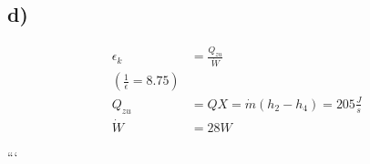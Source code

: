 \subsection*{d)}

\begin{align*}
\epsilon_k &= \frac{Q_{zu}}{\dot{W}} \\
\left( \frac{1}{\epsilon} = 8.75 \right) \\
Q_{zu} &= QX = \dot{m} (h_2 - h_4) = 205 \frac{J}{s} \\
\dot{W} &= 28 W
\end{align*}

```